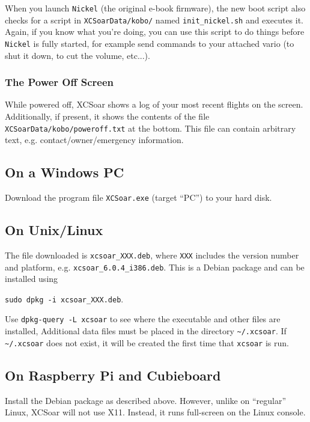 When you launch \texttt{Nickel} (the original e-book firmware), the new
boot script also checks for a script in \texttt{XCSoarData/kobo/} named
\texttt{init\_nickel.sh} and executes it. Again, if
you know what you're doing, you can use this script to do things
before \texttt{Nickel} is fully started, for example send commands
to your attached vario (to shut it down, to cut the volume, etc...).

\subsubsection{The Power Off Screen}

While powered off, XCSoar shows a log of your most recent flights on
the screen.  Additionally, if present, it shows the contents of the
file \texttt{XCSoarData/kobo/poweroff.txt} at the bottom.  This file
can contain arbitrary text, e.g. contact/owner/emergency information.

\subsection*{On a Windows PC}

Download the program file \verb|XCSoar.exe| (target ``PC'') to your
hard disk.

\subsection*{On Unix/Linux}

The file downloaded is \verb|xcsoar_XXX.deb|, where \verb|XXX| includes
the version number and platform, e.g. \verb|xcsoar_6.0.4_i386.deb|.
This is a Debian package and can be installed using
\begin{center}
\verb|sudo dpkg -i xcsoar_XXX.deb|.
\end{center}
Use \verb|dpkg-query -L xcsoar| to see where the executable and 
other files are installed,
Additional data files must be placed in the directory
\verb|~/.xcsoar|.
If \verb|~/.xcsoar| does not exist, it will be created the first time
that \verb|xcsoar| is run.

\subsection*{On Raspberry Pi and Cubieboard}

Install the Debian package as described above.  However, unlike on
``regular'' Linux, XCSoar will not use X11.  Instead, it runs
full-screen on the Linux console.

